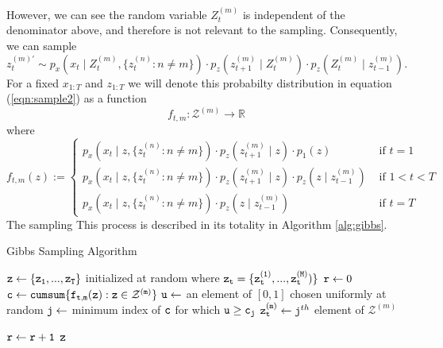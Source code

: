 \documentclass{amsart}
\begin{document}
However, we can see the random variable $Z_t^{(m)}$ is independent of the 
denominator above, and therefore is not 
relevant to the sampling. Consequently, we can sample 
\begin{equation}\label{eqn:sample2}
z_t^{(m)'}\sim p_x(x_t\mid Z_t^{(m)},\{z_t^{(n)}:n\neq m\})\cdot
p_z(z_{t+1}^{(m)}\mid Z_t^{(m)})\cdot
p_z(Z_t^{(m)}\mid z_{t-1}^{(m)}).
\end{equation}
For a fixed $x_{1:T}$ and $z_{1:T}$ we will denote this probabilty distribution 
in equation (\ref{eqn:sample2}) as a function 
\[
f_{t,m}:\mathcal Z^{(m)}\rightarrow \mathbb{R}
\]
where 
\[
f_{t,m}(z) := \begin{cases}
p_x(x_t\mid z,\{z_t^{(n)}:n\neq m\})\cdot
p_z(z_{t+1}^{(m)}\mid z)\cdot
p_1(z)& \text{ if }t=1\\
p_x(x_t\mid z,\{z_t^{(n)}:n\neq m\})\cdot
p_z(z_{t+1}^{(m)}\mid z)\cdot
p_z(z\mid z_{t-1}^{(m)})& \text{ if }1<t<T\\
p_x(x_t\mid z,\{z_t^{(n)}:n\neq m\})\cdot
p_z(z\mid z_{t-1}^{(m)})& \text{ if }t=T
\end{cases}
\]
The sampling This process is described in its totality in Algorithm \ref{alg:gibbs}.  


\begin{algorithm}
  \caption{Gibbs Sampling Algorithm\label{alg:gibbs}}
  \begin{algorithmic}[1]
    \State $\tt{z}\leftarrow \{z_1,...,z_T\}$ initialized at random where 
    $\tt{z}_t=\{z_t^{(1)},...,z_t^{(M)})\}$
    \State ${\tt r}\leftarrow 0$
        \State ${\tt c} \leftarrow {\tt cumsum \{f_{t,m}(z):z\in \mathcal 
        Z^{(m)}\}}$ 
        \label{eqn:alg_prob}
        \State ${\tt u}\leftarrow$ an element of $[0,1]$ chosen uniformly at 
        random
        \State ${\tt j}\leftarrow$ minimum index of ${\tt c}$ for which 
        $\tt{u}\geq c_j$
        \State ${\tt z_t^{(m)}}\leftarrow {\tt j}^{th}$ element of $\mathcal Z^{(m)}$

      \EndFor
      \State ${\tt r}\leftarrow {\tt r+1}$
      \EndWhile
      \State\Return ${\tt z}$
    \EndFunction
  \end{algorithmic}
\end{algorithm}
\end{document}
